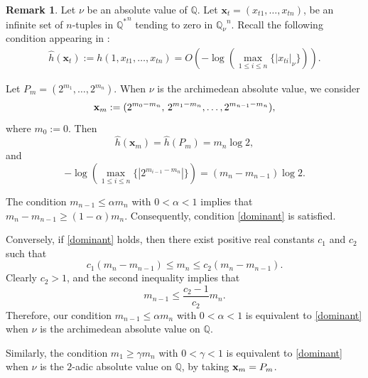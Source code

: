 \documentclass[10pt]{amsart}
\numberwithin{equation}{section}
\theoremstyle{plain}
\theoremstyle{definition}
\newtheorem{remark}[theorem]{Remark}
\begin{document}
\begin{remark}
Let $\nu$ be an absolute value of $\mathbb Q$.  
Let $\mathbf x_t=(x_{t1},\ldots,x_{tn})$,  be an infinite set of $n$-tuples in ${\mathbb Q^*}^n$ tending to zero in ${\mathbb Q_{\nu}}^n$.  
Recall the following condition appearing in \cite[Theorem~1]{CZ2005}:
\begin{align}\label{dominant}
{\hat h}(\mathbf x_t):=h(1,x_{t1},\ldots,x_{tn})
=O\!\left(-\log\!\left(\max_{1\le i\le n}\{|x_{ti}|_{\nu}\}\right)\right).
\end{align}

Let $P_m=(2^{m_1},\ldots,2^{m_n})$.  
When $\nu$ is the archimedean absolute value, we consider
\[
{\bf x}_m := (2^{m_0-m_n},\, 2^{m_1-m_n},\ldots,2^{m_{n-1}-m_n}),
\]
where $m_0:=0$. 
Then 
\[
\hat h({\mathbf x}_m)=\hat h(P_m)= m_n\log 2,
\]
and 
\[
-\log\!\left(\max_{1\le i\le n}\{|2^{m_{i-1}-m_n}|\}\right)
=(m_n-m_{n-1})\log 2.
\]

The condition $m_{n-1}\le\alpha m_n$ with $0<\alpha<1$ implies that 
$m_n-m_{n-1}\ge (1-\alpha)m_n$. Consequently,  condition \eqref{dominant} is satisfied.

Conversely, if \eqref{dominant} holds, then there exist positive real constants $c_1$ and $c_2$ such that 
\[
c_1(m_n-m_{n-1})\le m_n\le c_2(m_n-m_{n-1}).
\]
Clearly $c_2>1$, and the second inequality implies that 
\[
m_{n-1}\le\frac{c_2-1}{c_2} m_n.
\]
Therefore, our condition $m_{n-1}\le\alpha m_n$ with $0<\alpha<1$ is equivalent to \eqref{dominant} when $\nu$ is the archimedean absolute value on $\mathbb Q$.

Similarly, the condition $m_1\ge\gamma m_n$ with $0<\gamma<1$ is equivalent to \eqref{dominant} when $\nu$ is the $2$-adic absolute value on $\mathbb Q$, by taking ${\bf x}_m=P_m$.
\end{remark}
\end{document}
